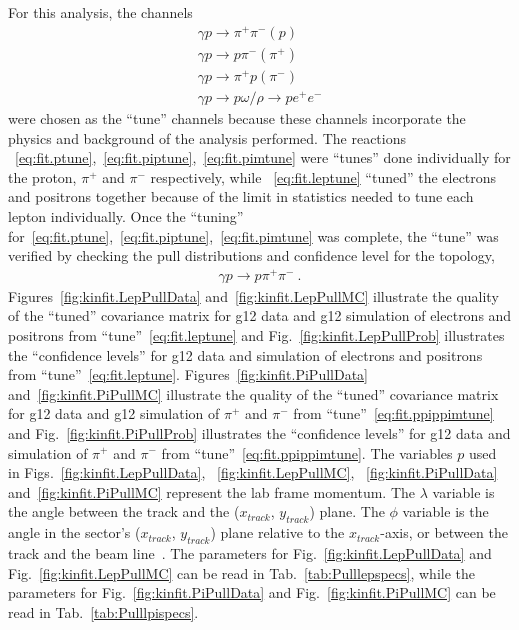 For this analysis, the channels
\begin{align}
\gamma p \rightarrow \pi^+ \pi^- (p) \label{eq:fit.ptune}\\
\gamma p \rightarrow p \pi^- (\pi^+) \label{eq:fit.piptune}\\
\gamma p \rightarrow \pi^+ p (\pi^-) \label{eq:fit.pimtune}\\
\gamma p \rightarrow p \omega/\rho \rightarrow p e^+ e^- \label{eq:fit.leptune}
\end{align}
%
were chosen as the ``tune'' channels because these channels incorporate the physics and background of the analysis performed. The reactions ~\ref{eq:fit.ptune},~\ref{eq:fit.piptune},~\ref{eq:fit.pimtune} were ``tunes'' done individually for the proton, $\pi^+$ and $\pi^-$ respectively, while ~\ref{eq:fit.leptune} ``tuned'' the electrons and positrons together because of the limit in statistics needed to tune each lepton individually. Once the ``tuning'' for~\ref{eq:fit.ptune},~\ref{eq:fit.piptune},~\ref{eq:fit.pimtune} was complete, the ``tune'' was verified by checking the pull distributions and confidence level for the topology,
\begin{align}
\gamma p \rightarrow p \pi^+ \pi^- \label{eq:fit.ppippimtune} \ .
\end{align}
Figures~\ref{fig:kinfit.LepPullData} and~\ref{fig:kinfit.LepPullMC} illustrate the quality of the ``tuned'' covariance matrix for g12 data and g12 simulation of electrons and positrons from ``tune''~\ref{eq:fit.leptune} and Fig.~\ref{fig:kinfit.LepPullProb} illustrates the ``confidence levels'' for g12 data and simulation of electrons and positrons from ``tune''~\ref{eq:fit.leptune}. Figures~\ref{fig:kinfit.PiPullData} and~\ref{fig:kinfit.PiPullMC} illustrate the quality of the ``tuned'' covariance matrix for g12 data and g12 simulation of $\pi^+$ and $\pi^-$ from ``tune''~\ref{eq:fit.ppippimtune} and Fig.~\ref{fig:kinfit.PiPullProb} illustrates the ``confidence levels'' for g12 data and simulation of $\pi^+$ and $\pi^-$ from ``tune''~\ref{eq:fit.ppippimtune}. The variables $p$ used in Figs.~\ref{fig:kinfit.LepPullData}, ~\ref{fig:kinfit.LepPullMC}, ~\ref{fig:kinfit.PiPullData} and~\ref{fig:kinfit.PiPullMC} represent the lab frame momentum. The $\lambda$ variable is the angle between the track and the ($x_{track}$, $y_{track}$) plane. The $\phi$ variable is the angle in the sector's ($x_{track}$, $y_{track}$) plane relative to the $x_{track}$-axis, or between the track and the beam line~\cite{dustin.kinfit}. The parameters for Fig.~\ref{fig:kinfit.LepPullData} and Fig.~\ref{fig:kinfit.LepPullMC} can be read in Tab.~\ref{tab:Pulllepspecs}, while the parameters for Fig.~\ref{fig:kinfit.PiPullData} and Fig.~\ref{fig:kinfit.PiPullMC} can be read in Tab.~\ref{tab:Pulllpispecs}.
